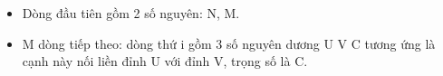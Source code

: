 \begin{itemize}
	\item Dòng đầu tiên gồm 2 số nguyên: N, M.
	\item M dòng tiếp theo: dòng thứ i gồm 3 số nguyên dương U V C tương ứng là cạnh này nối liền đỉnh U với đỉnh V, trọng số là C.
\end{itemize}